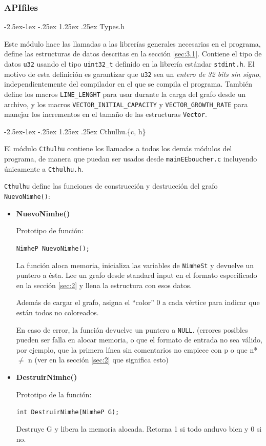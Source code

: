 \documentclass[11pt,a4paper]{article}
\makeatletter
\renewcommand\paragraph{\@startsection{paragraph}{4}{\z@}%
            {-2.5ex\@plus -1ex \@minus -.25ex}%
            {1.25ex \@plus .25ex}%
            {\normalfont\normalsize\bfseries}}
\theoremstyle{plain}
\makeatother
\begin{document}
			\subsubsection{APIfiles}

				\paragraph{Types.h}

Este módulo hace las llamadas a las librerías generales necesarias en el programa, define las estructuras de datos descritas en la sección \ref{sec:3.1}. Contiene el tipo de datos \texttt{u32} usando el tipo \texttt{uint32\_t} definido en la librería estándar \texttt{stdint.h}. El motivo de esta definición es garantizar que \texttt{u32} sea un \emph{entero de 32 bits sin signo}, independientemente del compilador en el que se compila el programa. También define los macros \texttt{LINE\_LENGHT} para usar durante la carga del grafo desde un archivo, y los macros \texttt{VECTOR\_INITIAL\_CAPACITY} y \texttt{VECTOR\_GROWTH\_RATE} para manejar los incrementos en el tamaño de las estructuras \texttt{Vector}.

				\paragraph{Cthulhu.\{c, h\}}

El módulo \texttt{Cthulhu} contiene los llamados a todos los demás módulos del programa, de manera que puedan ser usados desde \texttt{mainEEboucher.c} incluyendo únicamente a \texttt{Cthulhu.h}.

\texttt{Cthulhu} define las funciones de construcción y destrucción del grafo \texttt{NuevoNimhe()}:

\begin{itemize}
\item{\textbf{{NuevoNimhe()}}}

Prototipo de función:

\texttt{NimheP NuevoNimhe();}

La función aloca memoria, inicializa las variables de \texttt{NimheSt} y devuelve un puntero a ésta. Lee un grafo desde standard input en el formato especificado en la sección \ref{sec:2} y llena la estructura con esos datos.

Además de cargar el grafo, asigna el “color” 0 a cada vértice para indicar que están todos no coloreados.

En caso de error, la función devuelve un puntero a \texttt{NULL}. (errores posibles pueden ser falla en alocar memoria, o que el formato de entrada no sea válido, por ejemplo, que la primera línea sin comentarios no empiece con p o que n* $\neq$ n (ver en la sección \ref{sec:2} que significa esto)

\item{\textbf{{DestruirNimhe()}}}

Prototipo de la función:

\texttt{int DestruirNimhe(NimheP G);}

Destruye G y libera la memoria alocada. Retorna 1 si todo anduvo bien y 0 si no.

\end{itemize}
\end{document}
